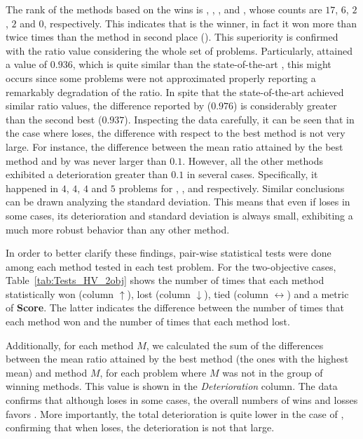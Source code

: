 The rank of the methods based on the wins is \AVSDMOEAD{}, \RMOEA{}, \MOEADDE{}, \NSGAIII{} and \NSGAII{}, whose counts are $17$, $6$, $2$, $2$ and $0$, respectively.
%
This indicates that \AVSDMOEAD{} is the winner, in fact it won more than twice times than the method in second place (\RMOEA{}).
%
This superiority is confirmed with the \HV{} ratio value considering the whole set of problems.
%
Particularly, \RMOEA{} attained a value of $0.936$, which is quite similar than the state-of-the-art \MOEAS{}, this might occurs since some problems were not approximated properly reporting a remarkably degradation of the \HV{} ratio.
%
In spite that the state-of-the-art \MOEAS{} achieved similar \HV{} ratio values, the difference reported by \AVSDMOEAD{} ($0.976$) is considerably greater than the second best \NSGAII{} ($0.937$).
%
Inspecting the data carefully, it can be seen that in the case where \AVSDMOEAD{} loses, the difference with respect to the best method is not very large.
%
For instance, the difference between the mean \HV{} ratio attained by the best method and by \AVSDMOEAD{} was never larger than $0.1$.
%
However, all the other methods exhibited a deterioration greater than $0.1$ in several cases.
%
Specifically, it happened in $4$, $4$, $4$ and $5$ problems for \RMOEA{}, \MOEADDE{}, \NSGAII{} and \NSGAIII{} respectively.
%
Similar conclusions can be drawn analyzing the standard deviation.
%
This means that even if \AVSDMOEAD{} loses in some cases, its deterioration and standard deviation is always small, exhibiting a much more robust behavior than any other method.


In order to better clarify these findings, pair-wise statistical tests were done among each method tested in each test problem.
%
For the two-objective cases, Table~\ref{tab:Tests_HV_2obj} shows the number of times that each method statistically won (column $\uparrow$), lost (column $\downarrow$), tied (column $\leftrightarrow$) and a metric of \textbf{Score}.
%
The latter indicates the difference between the number of times that each method won and the number of times that each method lost.

%
Additionally, for each method $M$, we calculated the sum of the differences between the mean \HV{} ratio attained by the best method (the ones with the highest mean) and method $M$, for each problem where $M$ was not in the group of winning methods.
%
This value is shown in the \textit{Deterioration} column.
%
The data confirms that although \AVSDMOEAD{} loses in some cases, the overall numbers of wins and losses favors \AVSDMOEAD{}.
%
More importantly, the total deterioration is quite lower in the case of \AVSDMOEAD{}, confirming that when \AVSDMOEAD{} loses, the deterioration is not that large.


